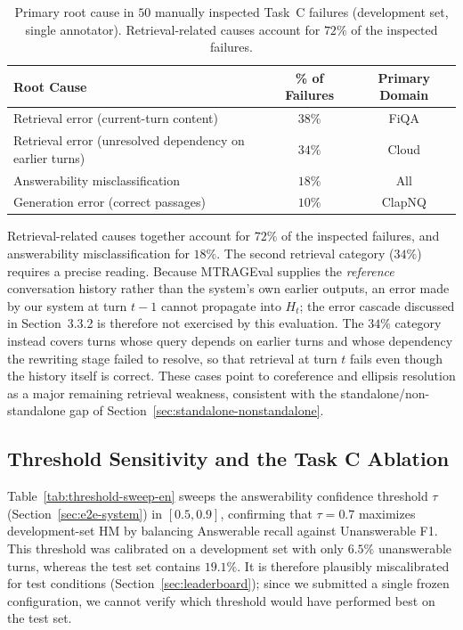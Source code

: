 \begin{table}[h]
\centering
\small
\begin{tabular}{lcc}
\toprule
\textbf{Root Cause} & \textbf{\% of Failures} & \textbf{Primary Domain} \\
\midrule
Retrieval error (current-turn content) & $38\%$ & FiQA \\
Retrieval error (unresolved dependency on earlier turns) & $34\%$ & Cloud \\
Answerability misclassification & $18\%$ & All \\
Generation error (correct passages) & $10\%$ & ClapNQ \\
\bottomrule
\end{tabular}
\caption{Primary root cause in $50$ manually inspected Task~C failures (development set, single annotator). Retrieval-related causes account for $72\%$ of the inspected failures.}
\label{tab:error-decomp-en}
\end{table}

Retrieval-related causes together account for $72\%$ of the inspected failures, and answerability misclassification for $18\%$. The second retrieval category ($34\%$) requires a precise reading. Because MTRAGEval supplies the \emph{reference} conversation history rather than the system's own earlier outputs, an error made by our system at turn $t-1$ cannot propagate into $H_t$; the error cascade discussed in Section~3.3.2 is therefore not exercised by this evaluation. The $34\%$ category instead covers turns whose query depends on earlier turns and whose dependency the rewriting stage failed to resolve, so that retrieval at turn $t$ fails even though the history itself is correct. These cases point to coreference and ellipsis resolution as a major remaining retrieval weakness, consistent with the standalone/non-standalone gap of Section~\ref{sec:standalone-nonstandalone}.

\subsection{Threshold Sensitivity and the Task C Ablation}
\label{sec:task-c-ablation}

Table~\ref{tab:threshold-sweep-en} sweeps the answerability confidence threshold $\tau$ (Section~\ref{sec:e2e-system}) in $[0.5, 0.9]$, confirming that $\tau{=}0.7$ maximizes development-set HM by balancing Answerable recall against Unanswerable F1. This threshold was calibrated on a development set with only $6.5\%$ unanswerable turns, whereas the test set contains $19.1\%$. It is therefore plausibly miscalibrated for test conditions (Section~\ref{sec:leaderboard}); since we submitted a single frozen configuration, we cannot verify which threshold would have performed best on the test set.

